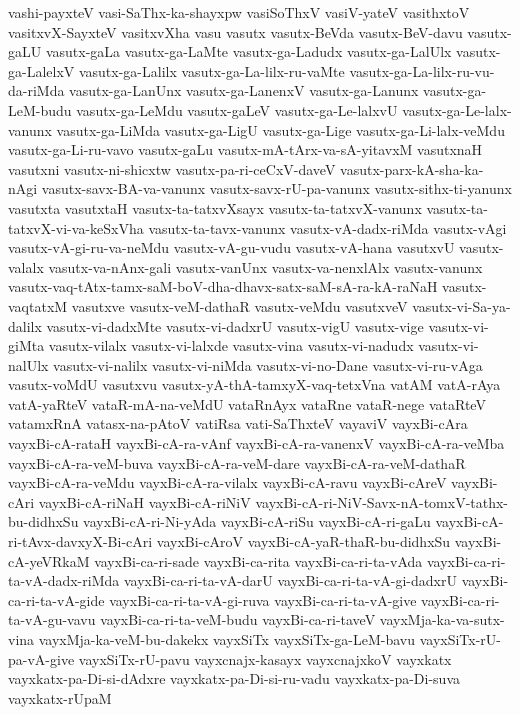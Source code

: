 {vashi-payxteV
vasi-SaThx-ka-shayxpw
vasiSoThxV
vasiV-yateV
vasithxtoV
vasitxvX-SayxteV
vasitxvXha
vasu
vasutx
vasutx-BeVda
vasutx-BeV-davu
vasutx-gaLU
vasutx-gaLa
vasutx-ga-LaMte
vasutx-ga-Ladudx
vasutx-ga-LalUlx
vasutx-ga-LalelxV
vasutx-ga-Lalilx
vasutx-ga-La-lilx-ru-vaMte
vasutx-ga-La-lilx-ru-vu-da-riMda
vasutx-ga-LanUnx
vasutx-ga-LanenxV
vasutx-ga-Lanunx
vasutx-ga-LeM-budu
vasutx-ga-LeMdu
vasutx-gaLeV
vasutx-ga-Le-lalxvU
vasutx-ga-Le-lalx-vanunx
vasutx-ga-LiMda
vasutx-ga-LigU
vasutx-ga-Lige
vasutx-ga-Li-lalx-veMdu
vasutx-ga-Li-ru-vavo
vasutx-gaLu
vasutx-mA-tArx-va-sA-yitavxM
vasutxnaH
vasutxni
vasutx-ni-shicxtw
vasutx-pa-ri-ceCxV-daveV
vasutx-parx-kA-sha-ka-nAgi
vasutx-savx-BA-va-vanunx
vasutx-savx-rU-pa-vanunx
vasutx-sithx-ti-yanunx
vasutxta
vasutxtaH
vasutx-ta-tatxvXsayx
vasutx-ta-tatxvX-vanunx
vasutx-ta-tatxvX-vi-va-keSxVha
vasutx-ta-tavx-vanunx
vasutx-vA-dadx-riMda
vasutx-vAgi
vasutx-vA-gi-ru-va-neMdu
vasutx-vA-gu-vudu
vasutx-vA-hana
vasutxvU
vasutx-valalx
vasutx-va-nAnx-gali
vasutx-vanUnx
vasutx-va-nenxlAlx
vasutx-vanunx
vasutx-vaq-tAtx-tamx-saM-boV-dha-dhavx-satx-saM-sA-ra-kA-raNaH
vasutx-vaqtatxM
vasutxve
vasutx-veM-dathaR
vasutx-veMdu
vasutxveV
vasutx-vi-Sa-ya-dalilx
vasutx-vi-dadxMte
vasutx-vi-dadxrU
vasutx-vigU
vasutx-vige
vasutx-vi-giMta
vasutx-vilalx
vasutx-vi-lalxde
vasutx-vina
vasutx-vi-nadudx
vasutx-vi-nalUlx
vasutx-vi-nalilx
vasutx-vi-niMda
vasutx-vi-no-Dane
vasutx-vi-ru-vAga
vasutx-voMdU
vasutxvu
vasutx-yA-thA-tamxyX-vaq-tetxVna
vatAM
vatA-rAya
vatA-yaRteV
vataR-mA-na-veMdU
vataRnAyx
vataRne
vataR-nege
vataRteV
vatamxRnA
vatasx-na-pAtoV
vatiRsa
vati-SaThxteV
vayaviV
vayxBi-cAra
vayxBi-cA-rataH
vayxBi-cA-ra-vAnf
vayxBi-cA-ra-vanenxV
vayxBi-cA-ra-veMba
vayxBi-cA-ra-veM-buva
vayxBi-cA-ra-veM-dare
vayxBi-cA-ra-veM-dathaR
vayxBi-cA-ra-veMdu
vayxBi-cA-ra-vilalx
vayxBi-cA-ravu
vayxBi-cAreV
vayxBi-cAri
vayxBi-cA-riNaH
vayxBi-cA-riNiV
vayxBi-cA-ri-NiV-Savx-nA-tomxV-tathx-bu-didhxSu
vayxBi-cA-ri-Ni-yAda
vayxBi-cA-riSu
vayxBi-cA-ri-gaLu
vayxBi-cA-ri-tAvx-davxyX-Bi-cAri
vayxBi-cAroV
vayxBi-cA-yaR-thaR-bu-didhxSu
vayxBi-cA-yeVRkaM
vayxBi-ca-ri-sade
vayxBi-ca-rita
vayxBi-ca-ri-ta-vAda
vayxBi-ca-ri-ta-vA-dadx-riMda
vayxBi-ca-ri-ta-vA-darU
vayxBi-ca-ri-ta-vA-gi-dadxrU
vayxBi-ca-ri-ta-vA-gide
vayxBi-ca-ri-ta-vA-gi-ruva
vayxBi-ca-ri-ta-vA-give
vayxBi-ca-ri-ta-vA-gu-vavu
vayxBi-ca-ri-ta-veM-budu
vayxBi-ca-ri-taveV
vayxMja-ka-va-sutx-vina
vayxMja-ka-veM-bu-dakekx
vayxSiTx
vayxSiTx-ga-LeM-bavu
vayxSiTx-rU-pa-vA-give
vayxSiTx-rU-pavu
vayxcnajx-kasayx
vayxcnajxkoV
vayxkatx
vayxkatx-pa-Di-si-dAdxre
vayxkatx-pa-Di-si-ru-vadu
vayxkatx-pa-Di-suva
vayxkatx-rUpaM
}
